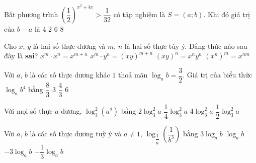 \begin{ex}%
	Bất phương trình $\left(\dfrac{1}{2}\right)^{x^2+4x} > \dfrac{1}{32}$ có tập nghiệm là $S=(a; b)$. Khi đó giá trị của $b-a$ là
	\choice
	{$4$}
	{$2$}
	{\True $6$}
	{$8$}
\end{ex}

\begin{ex}%
	Cho $x$, $y$ là hai số thực dương và $m$, $n$ là hai số thực tùy ý. Đẳng thức nào sau đây là \textbf{sai}?
	\choice
	{$x^m\cdot  x^n = x^{m+n}$}
	{\True $x^m\cdot  y^n = (xy)^{m+n}$}
	{$(xy)^n = x^n y^n$}
	{$(x^n)^m = x^{nm}$}
\end{ex}

\begin{ex}%
	Với $a$, $b$ là các số thực dương khác $1$ thoả mãn $\log_a b=\dfrac{3}{2}$. Giá trị của biểu thức $\log_a b^4$ bằng
	\choice
	{$\dfrac{8}{3}$}
	{$3$}
	{$\dfrac{4}{3}$}
	{\True $6$}
\end{ex}

%

\begin{ex}%
	Với mọi số thực $a$ dương, $\log_3^2(a^2)$ bằng
	\choice
	{$2\log_3^2a$}
	{$\dfrac{1}{4}\log_3^2a$}
	{\True $4\log_3^2a$}
	{$\dfrac{1}{2}\log_3^2a$}
\end{ex}

\begin{ex}%
	Với $a$, $b$ là các số thực dương tuỳ ý và $a \neq 1$, $\log_{\dfrac{1}{a}}\left(\dfrac{1}{b^3}\right)$ bằng
	\choice
	{$3\log_{a}b$}
	{$\log_{a}b$}
	{$-3\log_{a}b$}
	{$-\dfrac{1}{3}\log_{a}b$}
\end{ex}

